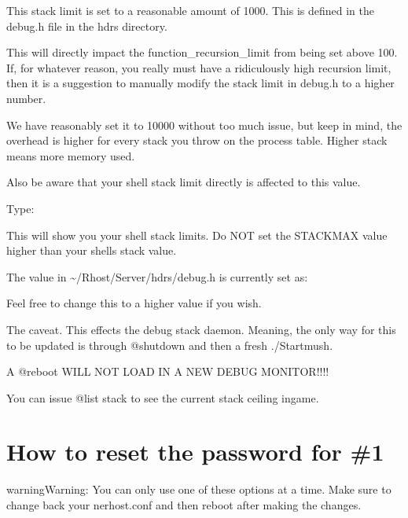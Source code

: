 \documentclass[letterpaper,10pt,english]{sphinxmanual}
\begin{document}
\sphinxAtStartPar
This stack limit is set to a reasonable amount of 1000.
This is defined in the debug.h file in the hdrs directory.

\sphinxAtStartPar
This will directly impact the function\_recursion\_limit from being
set above 100.  If, for whatever reason, you really must have
a ridiculously high recursion limit, then it is a suggestion to
manually modify the stack limit in debug.h to a higher number.

\sphinxAtStartPar
We have reasonably set it to 10000 without too much issue, but keep
in mind, the overhead is higher for every stack you throw on the
process table.  Higher stack means more memory used.

\sphinxAtStartPar
Also be aware that your shell stack limit directly is affected
to this value.

\sphinxAtStartPar
Type:

\begin{sphinxVerbatim}[commandchars=\\\{\}]
 
\end{sphinxVerbatim}

\sphinxAtStartPar
This will show you your shell stack limits.  Do NOT set the
STACKMAX value higher than your shell\textquotesingle{}s stack value.

\sphinxAtStartPar
The value in \textasciitilde{}/Rhost/Server/hdrs/debug.h is currently set as:

\begin{sphinxVerbatim}[commandchars=\\\{\}]
\end{sphinxVerbatim}

\sphinxAtStartPar
Feel free to change this to a higher value if you wish.

\sphinxAtStartPar
The caveat.  This effects the debug stack daemon.  Meaning,
the only way for this to be updated is through @shutdown and
then a fresh ./Startmush.

\sphinxAtStartPar
A @reboot WILL NOT LOAD IN A NEW DEBUG MONITOR!!!!

\sphinxAtStartPar
You can issue @list stack to see the current stack ceiling ingame.


\section{How to reset the password for \#1}
\label{\detokenize{troubleshooting:how-to-reset-the-password-for-1}}
\begin{sphinxadmonition}{warning}{Warning:}
\sphinxAtStartPar
You can only use one of these options at a time. Make sure to change back your nerhost.conf and then reboot after making the changes.
\end{sphinxadmonition}
\end{document}
